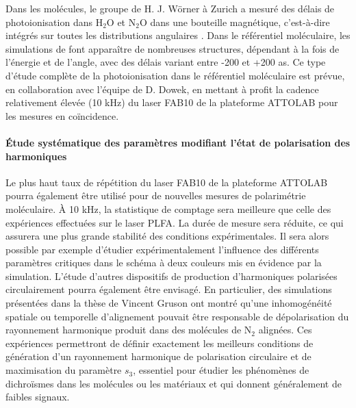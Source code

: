 Dans les molécules, le groupe de H. J. Wörner à Zurich a mesuré des délais de photoionisation dans H$_2$O et N$_2$O dans une bouteille magnétique, c'est-à-dire intégrés sur toutes les distributions angulaires . Dans le référentiel moléculaire, les simulations de  font apparaître de nombreuses structures, dépendant à la fois de l'énergie et de l'angle, avec des délais variant entre -200 et +200 as. Ce type d'étude complète de la photoionisation dans le référentiel moléculaire est prévue, en collaboration avec l'équipe de D. Dowek, en mettant à profit la cadence relativement élevée (10 kHz) du laser FAB10 de la plateforme ATTOLAB pour les mesures en coïncidence.

\paragraph*{\'{E}tude systématique des paramètres modifiant l'état de polarisation des harmoniques} Le plus haut taux de répétition du laser FAB10 de la plateforme ATTOLAB pourra également être utilisé pour de nouvelles mesures de polarimétrie moléculaire. \`{A} 10 kHz, la statistique de comptage sera meilleure que celle des expériences effectuées sur le laser PLFA. La durée de mesure sera réduite, ce qui assurera une plus grande stabilité des conditions expérimentales. Il sera alors possible par exemple d'étudier expérimentalement l'influence des différents paramètres critiques dans le schéma à deux couleurs mis en évidence par la simulation. L'étude d'autres dispositifs de production d'harmoniques polarisées circulairement pourra également être envisagé. En particulier, des simulations présentées dans la thèse de Vincent Gruson  ont montré qu'une inhomogénéité spatiale ou temporelle d'alignement pouvait être responsable de dépolarisation du rayonnement harmonique produit dans des molécules de N$_2$ alignées. Ces expériences permettront de définir exactement les meilleurs conditions de génération d'un rayonnement harmonique de polarisation circulaire et de maximisation du paramètre $s_3$, essentiel pour étudier les phénomènes de dichroïsmes dans les molécules ou les matériaux et qui donnent généralement de faibles signaux.

